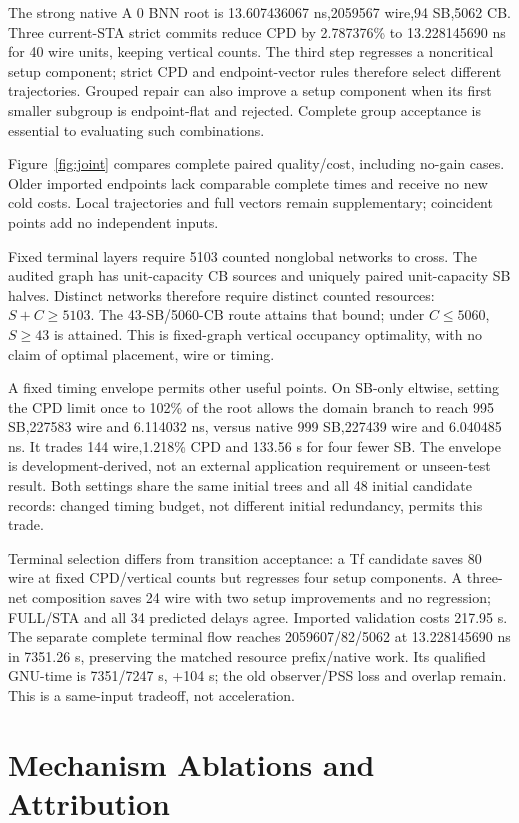 \documentclass[conference,10pt]{IEEEtran}
\begin{document}
The strong native A 0 BNN root is 13.607436067 ns,2059567 wire,94 SB,5062 CB. Three current-STA strict commits reduce CPD by 2.787376\% to 13.228145690 ns for 40 wire units, keeping vertical counts. The third step regresses a noncritical setup component; strict CPD and endpoint-vector rules therefore select different trajectories. Grouped repair can also improve a setup component when its first smaller subgroup is endpoint-flat and rejected. Complete group acceptance is essential to evaluating such combinations.

Figure~\ref{fig:joint} compares complete paired quality/cost, including no-gain cases. Older imported endpoints lack comparable complete times and receive no new cold costs. Local trajectories and full vectors remain supplementary; coincident points add no independent inputs.

Fixed terminal layers require 5103 counted nonglobal networks to cross. The audited graph has unit-capacity CB sources and uniquely paired unit-capacity SB halves. Distinct networks therefore require distinct counted resources: $S+C\ge 5103$. The 43-SB/5060-CB route attains that bound; under $C\le 5060$, $S\ge 43$ is attained. This is fixed-graph vertical occupancy optimality, with no claim of optimal placement, wire or timing.

A fixed timing envelope permits other useful points. On SB-only eltwise, setting the CPD limit once to 102\% of the root allows the domain branch to reach 995 SB,227583 wire and 6.114032 ns, versus native 999 SB,227439 wire and 6.040485 ns. It trades 144 wire,1.218\% CPD and 133.56 s for four fewer SB. The envelope is development-derived, not an external application requirement or unseen-test result. Both settings share the same initial trees and all 48 initial candidate records: changed timing budget, not different initial redundancy, permits this trade.

Terminal selection differs from transition acceptance: a Tf candidate saves 80 wire at fixed CPD/vertical counts but regresses four setup components. A three-net composition saves 24 wire with two setup improvements and no regression; FULL/STA and all 34 predicted delays agree. Imported validation costs 217.95 s. The separate complete terminal flow reaches 2059607/82/5062 at 13.228145690 ns in 7351.26 s, preserving the matched resource prefix/native work. Its qualified GNU-time is 7351/7247 s, +104 s; the old observer/PSS loss and overlap remain. This is a same-input tradeoff, not acceleration.

\section{Mechanism Ablations and Attribution}
\end{document}
